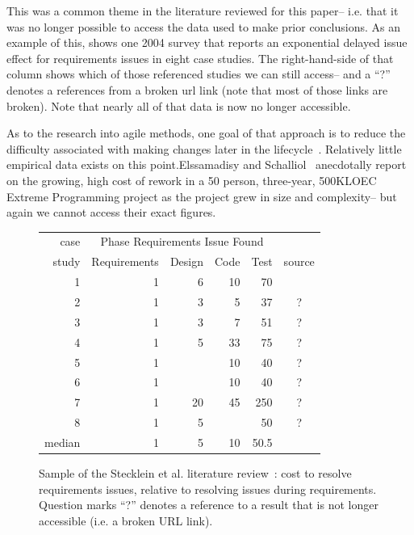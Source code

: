 This was a common theme in the literature reviewed for this paper-- i.e.  that  it was no longer possible to access
the data used to make prior conclusions.
As an example of this,  shows one 2004 survey that reports an exponential delayed issue  effect for 
requirements issues in eight case studies. The right-hand-side of that column shows which of those referenced studies
we can still access-- and a ``?'' denotes a references from a broken url link (note that most
of those links are broken). Note that nearly all of that data is now no longer accessible.


As to the research into agile methods, one goal of that approach
is to reduce the difficulty associated with making changes later in the lifecycle~\cite{beck00}. Relatively little empirical data exists on this point.Elssamadisy and Schalliol~\cite{Elssamadisy02} anecdotally report on the growing, high cost of rework in a 50 person, three-year, 500KLOEC Extreme Programming project as the project grew in size and complexity-- but again we cannot access their 
exact figures.


 


 \begin{figure}
{\small
\begin{center}
\begin{tabular}{r|rrrr|c}
 case& \multicolumn{4}{c|}{Phase Requirements Issue Found }&  \\
 study               &Requirements & Design & Code&  Test& source\\\hline
1 & 1& 6& 10& 70&~\cite{Boehm81}\\  
2& 1 &3& 5& 37&?\\ 
3&  1 &3& 7& 51& ?\\ 
4& 1& 5 &33 &75& ? \\
5& 1  &    & 10 & 40& ?\\ 
6& 1   &    & 10 &  40& ?\\
7&  1 & 20 & 45 & 250& ?\\  
8&  1  &   5 &      & 50& ? \\\hline
median           & 1 &  5  & 10   & 50.5 
\end{tabular}
\end{center}}
\caption{Sample of the Stecklein et al. literature review~\cite{steck04}:
cost to resolve requirements issues, relative to resolving issues during requirements.
Question marks ``?'' denotes a reference to
a result that is not longer accessible (i.e. a broken URL link).}\label{fig:steck}
\end{figure}


